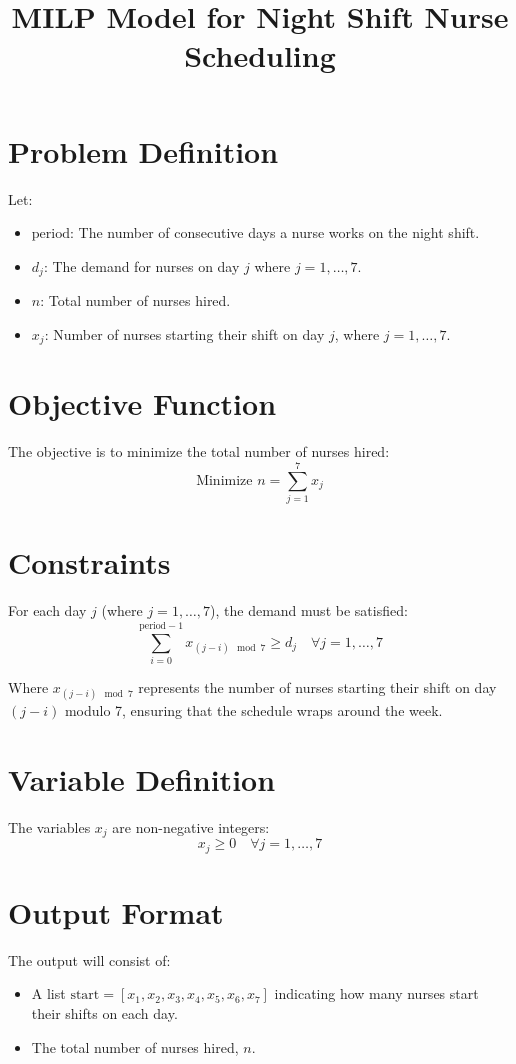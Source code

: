 \documentclass{article}
\begin{document}
\title{MILP Model for Night Shift Nurse Scheduling}
\author{}
\date{}
\maketitle

\section*{Problem Definition}

Let:
\begin{itemize}
    \item \( \text{period} \): The number of consecutive days a nurse works on the night shift.
    \item \( d_j \): The demand for nurses on day \( j \) where \( j = 1, \ldots, 7 \).
    \item \( n \): Total number of nurses hired.
    \item \( x_j \): Number of nurses starting their shift on day \( j \), where \( j = 1, \ldots, 7 \).
\end{itemize}

\section*{Objective Function}

The objective is to minimize the total number of nurses hired:
\[
\text{Minimize } n = \sum_{j=1}^7 x_j
\]

\section*{Constraints}

For each day \( j \) (where \( j = 1, \ldots, 7 \)), the demand must be satisfied:
\[
\sum_{i=0}^{\text{period}-1} x_{(j-i) \mod 7} \geq d_j \quad \forall j = 1, \ldots, 7
\]

Where \( x_{(j-i) \mod 7} \) represents the number of nurses starting their shift on day \( (j-i) \) modulo 7, ensuring that the schedule wraps around the week.

\section*{Variable Definition}

The variables \( x_j \) are non-negative integers:
\[
x_j \geq 0 \quad \forall j = 1, \ldots, 7
\]

\section*{Output Format}

The output will consist of:
\begin{itemize}
    \item A list \( \text{start} = [x_1, x_2, x_3, x_4, x_5, x_6, x_7] \) indicating how many nurses start their shifts on each day.
    \item The total number of nurses hired, \( n \).
\end{itemize}
\end{document}
